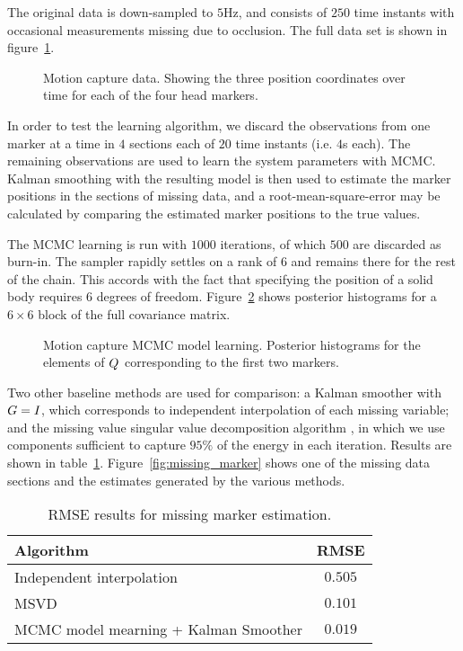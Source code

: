\documentclass[journal,10pt]{IEEEtran}
\begin{document}
The original data is down-sampled to $5$Hz, and consists of $250$ time instants with occasional measurements missing due to occlusion. The full data set is shown in figure~\ref{fig:mocap_data}.

\begin{figure}
 \centering
 \caption{Motion capture data. Showing the three position coordinates over time for each of the four head markers.}
 \label{fig:mocap_data}
\end{figure}

In order to test the learning algorithm, we discard the observations from one marker at a time in $4$ sections each of $20$ time instants (i.e. $4$s each). The remaining observations are used to learn the system parameters with MCMC. Kalman smoothing with the resulting model is then used to estimate the marker positions in the sections of missing data, and a root-mean-square-error may be calculated by comparing the estimated marker positions to the true values. 

The MCMC learning is run with $1000$ iterations, of which $500$ are discarded as burn-in. The sampler rapidly settles on a rank of $6$ and remains there for the rest of the chain. This accords with the fact that specifying the position of a solid body requires $6$ degrees of freedom. Figure~\ref{fig:mocap_Qhist} shows posterior histograms for a $6\times6$ block of the full covariance matrix.

\begin{figure}
 \centering
 \caption{Motion capture MCMC model learning. Posterior histograms for the elements of $Q_{}$ corresponding to the first two markers.}
 \label{fig:mocap_Qhist}
\end{figure}

Two other baseline methods are used for comparison: a Kalman smoother with $G=I_{}$, which corresponds to independent interpolation of each missing variable; and the missing value singular value decomposition algorithm \cite{Srebro2003,Liu2006,Li2009}, in which we use components sufficient to capture $95\%$ of the energy in each iteration. Results are shown in table~\ref{tab:mocap_rmse}. Figure~\ref{fig:missing_marker} shows one of the missing data sections and the estimates generated by the various methods.

\begin{table}[t]
\centering
\begin{tabular}{l|c}
 Algorithm                              & RMSE \\
 \hline
 Independent interpolation              & $0.505$ \\
 MSVD                                   & $0.101$ \\
 MCMC model mearning + Kalman Smoother  & $0.019$
\end{tabular}
\caption{RMSE results for missing marker estimation.}
\label{tab:mocap_rmse}
\end{table}
\end{document}
